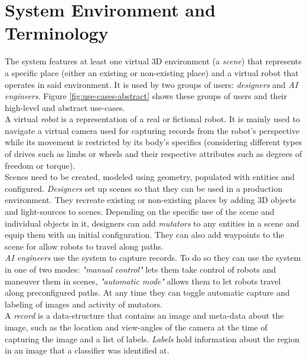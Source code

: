\section{System Environment and Terminology}
The system features at least one virtual 3D environment (a \textit{scene}) that represents a specific place (either an existing or non-existing place) and a virtual robot that operates in said environment. It is used by two groups of users: \textit{designers} and \textit{\ac{AI} engineers}. Figure \ref{fig:use-cases-abstract} shows these groups of users and their high-level and abstract use-cases.\\
A virtual \textit{robot} is a representation of a real or fictional robot. It is mainly used to navigate a virtual camera used for capturing records from the robot's perspective while its movement is restricted by its body's specifics (considering different types of drives such as limbs or wheels and their respective attributes such as degrees of freedom or torque).\\
Scenes need to be created, modeled using geometry, populated with entities and configured. \textit{Designers} set up scenes so that they can be used in a production environment. They recreate existing or non-existing places by adding 3D objects and light-sources to scenes. Depending on the specific use of the scene and individual objects in it, designers can add \textit{mutators} to any entities in a scene and equip them with an initial configuration. They can also add waypoints to the scene for allow robots to travel along paths.\\
\textit{\acs{AI} engineers} use the system to capture records. To do so they can use the system in one of two modes: \textit{"manual control"} lets them take control of robots and maneuver them in scenes, \textit{"automatic mode"} allows them to let robots travel along preconfigured paths. At any time they can toggle automatic capture and labeling of images and activity of mutators.\\
A \textit{record} is a data-structure that contains an image and meta-data about the image, such as the location and view-angles of the camera at the time of capturing the image and a list of labels. \textit{Labels} hold information about the region in an image that a classifier was identified at.

